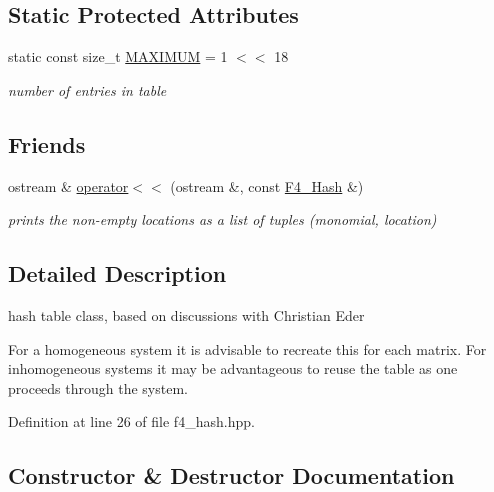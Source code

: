 \subsection*{Static Protected Attributes}
\begin{DoxyCompactItemize}
\item 
\mbox{\label{class_f4___hash_acf7ba1127b19f75bfcd7177c4de99d01}} 
static const size\+\_\+t \hyperlink{class_f4___hash_acf7ba1127b19f75bfcd7177c4de99d01}{M\+A\+X\+I\+M\+UM} = 1 $<$$<$ 18
\begin{DoxyCompactList}\small\item\em number of entries in table \end{DoxyCompactList}\end{DoxyCompactItemize}
\subsection*{Friends}
\begin{DoxyCompactItemize}
\item 
\mbox{\label{class_f4___hash_a979748da85dd3012fb925b0ff6b9b71c}} 
ostream \& \hyperlink{class_f4___hash_a979748da85dd3012fb925b0ff6b9b71c}{operator$<$$<$} (ostream \&, const \hyperlink{class_f4___hash}{F4\+\_\+\+Hash} \&)
\begin{DoxyCompactList}\small\item\em prints the non-\/empty locations as a list of tuples (monomial, location) \end{DoxyCompactList}\end{DoxyCompactItemize}


\subsection{Detailed Description}
hash table class, based on discussions with Christian Eder 

For a homogeneous system it is advisable to recreate this for each matrix. For inhomogeneous systems it may be advantageous to reuse the table as one proceeds through the system. 

Definition at line 26 of file f4\+\_\+hash.\+hpp.



\subsection{Constructor \& Destructor Documentation}
\mbox{\label{class_f4___hash_a3983b59e08fa7ad90bba989850f9850f}} 

